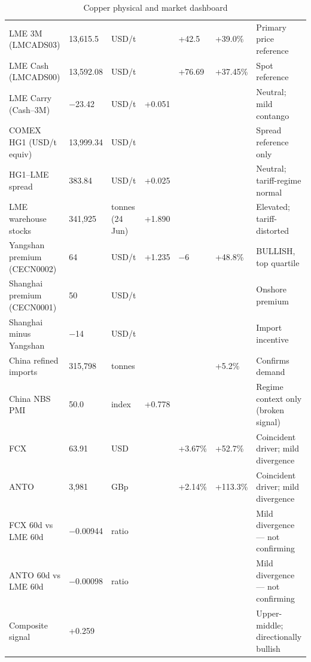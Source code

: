 \documentclass[11pt,a4paper]{article}
\begin{document}
\begin{table}[htbp]
\caption{Copper physical and market dashboard}
\footnotesize
\begin{tabularx}{\linewidth}{P{2.6cm} Q{1.7cm} P{1.5cm} Q{1.4cm} Q{1.2cm} Q{1.2cm} L}
\toprule
{} &  &  &  &  &  &  \\
\midrule
LME 3M (LMCADS03) & 13,615.5 & USD/t & & +42.5 & +39.0\% & Primary price reference \\
LME Cash (LMCADS00) & 13,592.08 & USD/t & & +76.69 & +37.45\% & Spot reference \\
LME Carry (Cash--3M) & \(-\)23.42 & USD/t & +0.051 & & & Neutral; mild contango \\
COMEX HG1 (USD/t equiv) & 13,999.34 & USD/t & & & & Spread reference only \\
HG1--LME spread & 383.84 & USD/t & +0.025 & & & Neutral; tariff-regime normal \\
LME warehouse stocks & 341,925 & tonnes (24 Jun) & +1.890 & & & Elevated; tariff-distorted \\
Yangshan premium (CECN0002) & 64 & USD/t & +1.235 & \(-\)6 & +48.8\% & BULLISH, top quartile \\
Shanghai premium (CECN0001) & 50 & USD/t & & & & Onshore premium \\
Shanghai minus Yangshan & \(-\)14 & USD/t & & & & Import incentive \\
China refined imports & 315,798 & tonnes & & & +5.2\% & Confirms demand \\
China NBS PMI & 50.0 & index & +0.778 & & & Regime context only (broken signal) \\
FCX & 63.91 & USD & & +3.67\% & +52.7\% & Coincident driver; mild divergence \\
ANTO & 3,981 & GBp & & +2.14\% & +113.3\% & Coincident driver; mild divergence \\
FCX 60d vs LME 60d & \(-\)0.00944 & ratio & & & & Mild divergence --- not confirming \\
ANTO 60d vs LME 60d & \(-\)0.00098 & ratio & & & & Mild divergence --- not confirming \\
Composite signal & +0.259 & & & & & Upper-middle; directionally bullish \\
\bottomrule
\end{tabularx}
\end{table}
\end{document}
